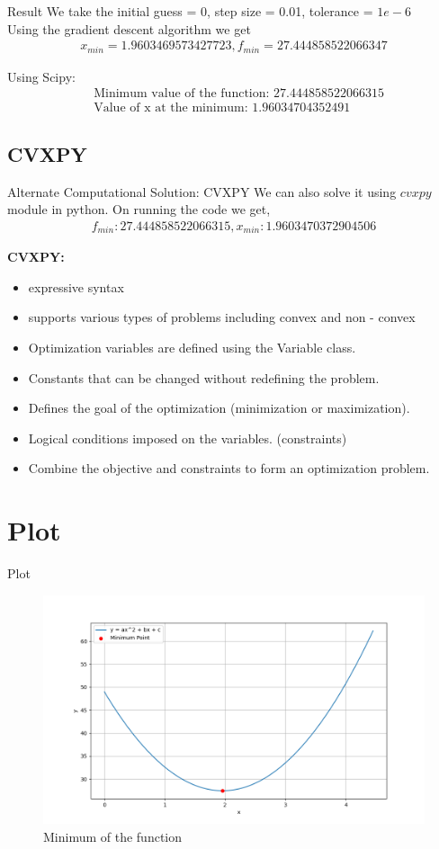 \documentclass{beamer}
\theoremstyle{remark}
\numberwithin{equation}{section}
\begin{document}
\begin{frame}{Result}
        We take the initial guess = 0, step size = 0.01, tolerance = $1e - 6$\\
    Using the gradient descent algorithm we get
    \begin{align}
        x_{min} = 1.9603469573427723, f_{min} = 27.444858522066347
    \end{align}

    Using Scipy:
\begin{align}
    &\text{Minimum value of the function: }27.444858522066315\\
    &\text{Value of x at the minimum: }1.96034704352491
\end{align}
\end{frame}

\subsection{CVXPY}
\begin{frame}{Alternate Computational Solution: CVXPY}
    We can also solve it using $cvxpy$ module in python. On running the code we get,
\begin{align}
    f_{min}: 27.444858522066315,
    x_{min}: 1.9603470372904506
\end{align}

\textbf{CVXPY:}
\begin{itemize}
    \item expressive syntax
    \item supports various types of problems including convex and non - convex 
    \item Optimization variables are defined using the Variable class.
    \item Constants that can be changed without redefining the problem.
    \item Defines the goal of the optimization (minimization or maximization).
    \item Logical conditions imposed on the variables. (constraints)
    \item Combine the objective and constraints to form an optimization problem.
\end{itemize}
\end{frame}

\section{Plot}
\begin{frame}{Plot}
    \begin{figure}[ht]
   \centering
   \includegraphics[width=1\columnwidth]{figs/fig.png}
   \caption{Minimum of the function}
\end{figure}
\end{frame}
\end{document}
